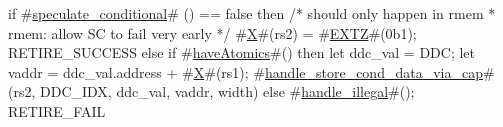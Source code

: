 if #\hyperref[sailRISCVzspeculatezyconditional]{speculate\_conditional}# () == false then {
  /* should only happen in rmem
   * rmem: allow SC to fail very early
   */
  #\hyperref[sailRISCVzX]{X}#(rs2) = #\hyperref[sailRISCVzEXTZ]{EXTZ}#(0b1);
  RETIRE_SUCCESS
} else if #\hyperref[sailRISCVzhaveAtomics]{haveAtomics}#() then {
  let ddc_val = DDC;
  let vaddr = ddc_val.address + #\hyperref[sailRISCVzX]{X}#(rs1);
  #\hyperref[sailRISCVzhandlezystorezycondzydatazyviazycap]{handle\_store\_cond\_data\_via\_cap}#(rs2, DDC_IDX, ddc_val, vaddr, width)
} else {
  #\hyperref[sailRISCVzhandlezyillegal]{handle\_illegal}#();
  RETIRE_FAIL
}
